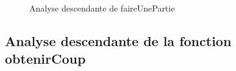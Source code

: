 \documentclass{article}
\begin{document}
\begin{figure}[H]
    \caption{Analyse descendante de faireUnePartie}
    \label{un-identifiant}
\end{figure}

\subsection{Analyse descendante de la fonction obtenirCoup}
\end{document}
